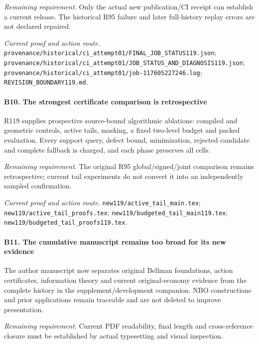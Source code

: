 \par\emph{Remaining requirement.} Only the actual new publication/\allowbreak{}CI receipt can establish a current release. The historical R95 failure and later full-history replay errors are not declared repaired.

\par\emph{Current proof and action route.} \nolinkurl{provenance/historical/ci_attempt01/FINAL_JOB_STATUS119.json}; \nolinkurl{provenance/historical/ci_attempt01/JOB_STATUS_AND_DIAGNOSIS119.json}; \nolinkurl{provenance/historical/ci_attempt01/job-117605227246.log}; \nolinkurl{REVISION_BOUNDARY119.md}.

\paragraph{B10. The strongest certificate comparison is retrospective}

R119 supplies prospective source-bound algorithmic ablations: compiled and geometric controls, active tails, masking, a fixed two-level budget and packed evaluation. Every support query, defect bound, minimization, rejected candidate and complete fallback is charged, and each phase preserves all cells.

\par\emph{Remaining requirement.} The original R95 global/\allowbreak{}signed/\allowbreak{}joint comparison remains retrospective; current tail experiments do not convert it into an independently sampled confirmation.

\par\emph{Current proof and action route.} \nolinkurl{new119/active_tail_main.tex}; \nolinkurl{new119/active_tail_proofs.tex}; \nolinkurl{new119/budgeted_tail_main119.tex}; \nolinkurl{new119/budgeted_tail_proofs119.tex}.

\paragraph{B11. The cumulative manuscript remains too broad for its new evidence}

The author manuscript now separates original Bellman foundations, action certificates, information theory and current original-economy evidence from the complete history in the supplement/\allowbreak{}development companion. NBO constructions and prior applications remain traceable and are not deleted to improve presentation.

\par\emph{Remaining requirement.} Current PDF readability, final length and cross-reference closure must be established by actual typesetting and visual inspection.

